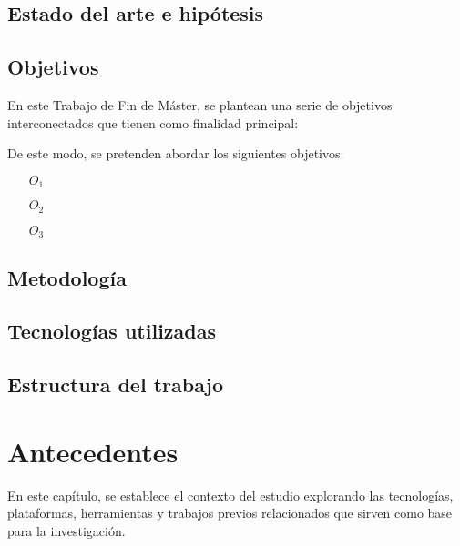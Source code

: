 \documentclass[12pt,a4paper,onecolumn,oneside]{report}
\begin{document}
\section{Estado del arte e hipótesis}
\section{Objetivos}

En este Trabajo de Fin de Máster, se plantean una serie de objetivos interconectados que tienen como finalidad principal:


De este modo, se pretenden abordar los siguientes objetivos: 

\begin{itemize}
 

    \item[$O_1$]

    \item[$O_2$] 
    
    \item[$O_3$] 
\end{itemize}



\section*{Metodología}


\section*{Tecnologías utilizadas}



\section*{Estructura del trabajo}



\chapter{Antecedentes}
\label{Antecedentes}

En este capítulo, se establece el contexto del estudio explorando las tecnologías, plataformas, herramientas y trabajos previos relacionados que sirven como base para la investigación.
\end{document}
